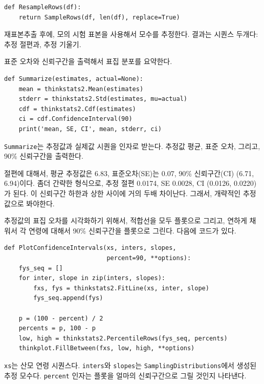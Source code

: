 \begin{verbatim}
def ResampleRows(df):
    return SampleRows(df, len(df), replace=True)
\end{verbatim}

재표본추출 후에, 모의 시험 표본을 사용해서 모수를 추정한다.
결과는 시퀀스 두개다: 추정 절편과, 추정 기울기.


표준 오차와 신뢰구간을 출력해서 표집 분포를 요약한다.

\begin{verbatim}
def Summarize(estimates, actual=None):
    mean = thinkstats2.Mean(estimates)
    stderr = thinkstats2.Std(estimates, mu=actual)
    cdf = thinkstats2.Cdf(estimates)
    ci = cdf.ConfidenceInterval(90)
    print('mean, SE, CI', mean, stderr, ci)
\end{verbatim}

{\tt Summarize}는 추정값과 실제값 시퀀을 인자로 받는다. 추정값 평균, 표준 오차, 그리고, 90\% 신뢰구간을 출력한다.

절편에 대해서, 평균 추정값은 6.83, 표준오차(SE)는 0.07, 90\% 신뢰구간(CI) (6.71, 6.94)이다. 좀더 간략한 형식으로, 추정 절편 0.0174, SE 0.0028, CI (0.0126, 0.0220)가 된다. 이 신뢰구간 하한과 상한 사이에 거의 두배 차이난다. 그래서, 개략적인 추정값으로 봐야한다.


추정값의 표집 오차를 시각화하기 위해서, 적합선을 모두 플롯으로 그리고, 연하게 채워서 각 연령에 대해서 90\% 신뢰구간을 플롯으로 그린다. 다음에 코드가 있다.

\begin{verbatim}
def PlotConfidenceIntervals(xs, inters, slopes,
                            percent=90, **options):
    fys_seq = []
    for inter, slope in zip(inters, slopes):
        fxs, fys = thinkstats2.FitLine(xs, inter, slope)
        fys_seq.append(fys)

    p = (100 - percent) / 2
    percents = p, 100 - p
    low, high = thinkstats2.PercentileRows(fys_seq, percents)
    thinkplot.FillBetween(fxs, low, high, **options)
\end{verbatim}

{\tt xs}는 산모 연령 시퀀스다. {\tt inters}와 {\tt slopes}는 {\tt SamplingDistributions}에서 생성된 추정 모수다. {\tt percent} 인자는 플롯을 얼마의 신뢰구간으로 그릴 것인지 나타낸다.

